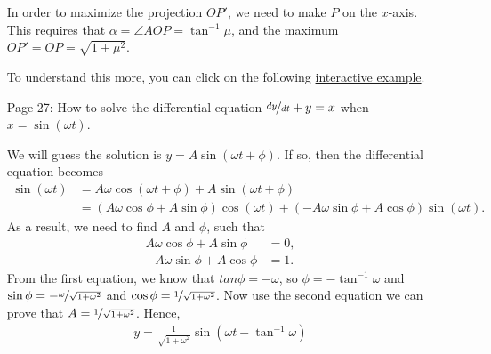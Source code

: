 \documentclass{article}
\begin{document}
\begin{enumerate}
In order to maximize the projection $OP'$, we need to make $P$ on the $x$-axis. This requires that $\alpha = \angle AOP = \tan^{-1}\mu$, and the maximum $OP' = OP = \sqrt{1+\mu^2}$.

To understand this more, you can click on the following \href{https://www.desmos.com/calculator/0rbehs0dfw}{interactive example}.

\item[Page 27:] How to solve the differential equation $\nicefrac{dy}{dt} + y = x$ when $x = \sin(\omega t)$.
  
We will guess the solution is $y = A \sin(\omega t + \phi)$. If so, then the differential equation becomes
\begin{align*}
  \sin(\omega t) &= A \omega \cos(\omega t+\phi) + A \sin(\omega t + \phi)\\
&= (A \omega \cos \phi + A \sin \phi) \cos (\omega t) +  (-A \omega \sin \phi + A \cos \phi) \sin (\omega t).
\end{align*}
As a result, we need to find $A$ and $\phi$, such that
\begin{align*}
 A \omega \cos \phi + A \sin \phi& = 0,\\
-A \omega \sin \phi + A \cos \phi &=1.
\end{align*}
From the first equation, we know that $tan \phi = -\omega$, so $\phi = -\tan^{-1}\omega$ and $\sin \phi = -\nicefrac{\omega}{\sqrt{1+\omega^2}}$ and $\cos \phi = \nicefrac{1}{\sqrt{1+\omega^2}}$. Now use the second equation we can prove that $A = \nicefrac{1}{\sqrt{1+\omega^2}}$. Hence,
\begin{align*}
 y = \frac{1}{\sqrt{1+\omega^2}}\sin(\omega t - \tan^{-1}\omega) 
\end{align*}


\end{enumerate}
\end{document}
